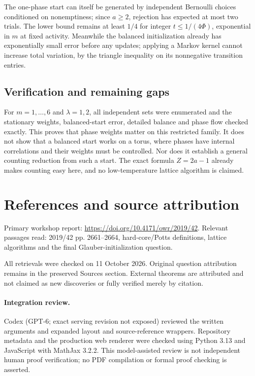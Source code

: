 \documentclass[11pt]{article}
\begin{document}
The one-phase start can itself be generated by independent Bernoulli choices conditioned on nonemptiness; since $a\ge2$, rejection has expected at most two trials. The lower bound remains at least $1/4$ for integer $t\le1/(4\Phi)$, exponential in $m$ at fixed activity. Meanwhile the balanced initialization already has exponentially small error before any updates; applying a Markov kernel cannot increase total variation, by the triangle inequality on its nonnegative transition entries.
\subsection{Verification and remaining gaps}
For $m=1,\ldots,6$ and $\lambda=1,2$, all independent sets were enumerated and the stationary weights, balanced-start error, detailed balance and phase flow checked exactly. This proves that phase weights matter on this restricted family. It does not show that a balanced start works on a torus, where phases have internal correlations and their weights must be controlled. Nor does it establish a general counting reduction from such a start. The exact formula $Z=2a-1$ already makes counting easy here, and no low-temperature lattice algorithm is claimed.

\section{References and source attribution}
Primary workshop report: \url{https://doi.org/10.4171/owr/2019/42}. Relevant passages read: 2019/42 pp. 2661--2664, hard-core/Potts definitions, lattice algorithms and the final Glauber-initialization question.

All retrievals were checked on 11 October 2026. Original question attribution remains in the preserved Sources section. External theorems are attributed and not claimed as new discoveries or fully verified merely by citation.


\paragraph{Integration review.} Codex (GPT-6; exact serving revision not exposed) reviewed the written arguments and expanded layout and source-reference wrappers. Repository metadata and the production web renderer were checked using Python 3.13 and JavaScript with MathJax 3.2.2. This model-assisted review is not independent human proof verification; no PDF compilation or formal proof checking is asserted.
\end{document}
